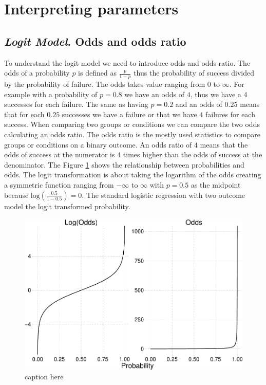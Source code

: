 \documentclass[
  man,floatsintext]{apa6}
\begin{document}
\section{Interpreting parameters}\label{interpreting-parameters}

\subsection{\texorpdfstring{\emph{Logit Model}. Odds and odds ratio}{Logit Model. Odds and odds ratio}}\label{logit-model.-odds-and-odds-ratio}

To understand the logit model we need to introduce odds and odds ratio. The odds of a probability \(p\) is defined as \(\frac{p}{1 - p}\) thus the probability of success divided by the probability of failure. The odds takes value ranging from 0 to \(\infty\). For example with a probability of \(p = 0.8\) we have an odds of \(4\), thus we have a 4 successes for each failure. The same as having \(p = 0.2\) and an odds of \(0.25\) means that for each \(0.25\) successes we have a failure or that we have \(4\) failures for each success. When comparing two groups or conditions we can compare the two odds calculating an odds ratio. The odds ratio is the mostly used statistics to compare groups or conditions on a binary outcome. An odds ratio of \(4\) means that the odds of success at the numerator is 4 times higher than the odds of success at the denominator. The Figure \ref{fig:fig-odds-example} shows the relationship between probabilities and odds. The logit transformation is about taking the logarithm of the odds creating a symmetric function ranging from \(-\infty\) to \(\infty\) with \(p = 0.5\) as the midpoint because \(\text{log}(\frac{0.5}{1 - 0.5}) = 0\). The standard logistic regression with two outcome model the logit transformed probability.

\scriptsize

\begin{figure}

{\centering \includegraphics{paper-new_files/figure-latex/fig-odds-example-1} 

}

\caption{caption here}\label{fig:fig-odds-example}
\end{figure}
\end{document}
